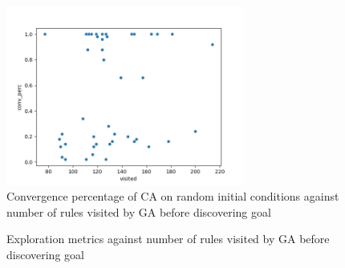 \begin{figure}[!h]
\centering
\includegraphics[width=0.7\textwidth]{images/metrics/conv_perc.png}
\caption{Convergence percentage of CA on random initial conditions against number of rules visited by GA before discovering goal}
\label{fig:conv-perc}
\end{figure}

\begin{figure}[!h]
            \hfill
            \hfill
            \newline
            \hfill
            \hfill
            \caption{Exploration metrics against number of rules visited by GA before discovering goal}
\label{fig:all-metrics}
\end{figure}

